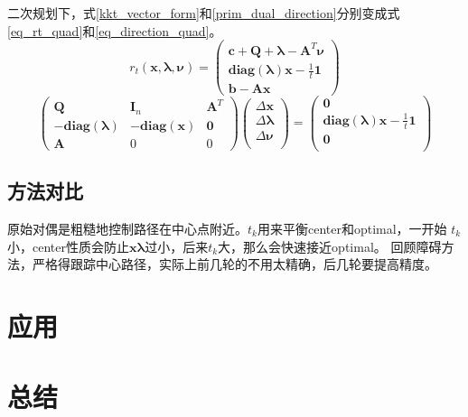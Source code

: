 \documentclass{article}
\begin{document}
二次规划下，式\eqref{kkt_vector_form}和\eqref{prim_dual_direction}分别变成式\eqref{eq_rt_quad}和\eqref{eq_direction_quad}。
\newcommand{\bx}{\bm x}
\newcommand{\bl}{\bm \lambda}
\newcommand{\bn}{\bm \nu}
\newcommand{\bQ}{\bm Q}
\newcommand{\bA}{\bm A}
\newcommand{\AT}{\bm A^T}
\newcommand{\bc}{\bm c}
\newcommand{\bb}{\bm b}
\newcommand{\diaglambda}{\textbf{diag}(\bm\lambda)}
\newcommand{\diagx}{\textbf{diag}(\bm x)}
\newcommand{\be}{\bm 1}
\newcommand{\dx}{\Delta\bm x}
\newcommand{\dl}{\Delta\bm \lambda}
\newcommand{\dn}{\Delta\bm \nu}
\begin{equation}
    \label{eq_rt_quad}
    r_t(\bx,\bl,\bn)=\begin{pmatrix}
        \bc+\bQ+\bl-\AT\bn\\
        \diaglambda\bx-\frac{1}{t}\be\\
        \bb-\bA\bx
    \end{pmatrix}
\end{equation}
\begin{equation}
    \label{eq_direction_quad}
    \begin{pmatrix}
        \bQ &\bm I_n & \AT\\
        -\diaglambda& -\diagx & \bm 0 \\
        \bA & 0 & 0
    \end{pmatrix}
    \begin{pmatrix}
        \dx\\
        \dl\\
        \dn\\
    \end{pmatrix}=
    \begin{pmatrix}
        \bm 0\\
        \diaglambda\bx-\frac{1}{t}\be\\
        \bm 0\\
    \end{pmatrix}
\end{equation}
$$$$













\subsection{方法对比}
原始对偶是粗糙地控制路径在中心点附近。$t_k$用来平衡center和optimal，一开始
$t_k$小，center性质会防止$\bm x$$\bm \lambda$过小，后来$t_k$大，那么会快速接近optimal。
回顾障碍方法，严格得跟踪中心路径，实际上前几轮的不用太精确，后几轮要提高精度。
\label{time_complexity}
\section{应用}
\section{总结}
\end{document}
